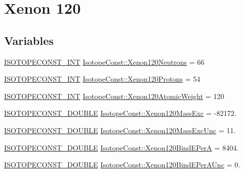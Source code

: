 \hypertarget{group___isotope_const-_xenon-_xe120}{}\section{Xenon 120}
\label{group___isotope_const-_xenon-_xe120}
\subsection*{Variables}
\begin{DoxyCompactItemize}
\item 
\mbox{\hyperlink{group___isotope_const-_macros_ga5f18360b3e99483a35c32d789e62621c}{I\+S\+O\+T\+O\+P\+E\+C\+O\+N\+S\+T\+\_\+\+I\+NT}} \mbox{\hyperlink{group___isotope_const-_xenon-_xe120_gaa4719d12c909c03c1bf8dfccb81d6556}{Isotope\+Const\+::\+Xenon120\+Neutrons}} = 66
\item 
\mbox{\hyperlink{group___isotope_const-_macros_ga5f18360b3e99483a35c32d789e62621c}{I\+S\+O\+T\+O\+P\+E\+C\+O\+N\+S\+T\+\_\+\+I\+NT}} \mbox{\hyperlink{group___isotope_const-_xenon-_xe120_ga835b7d6b04906dff91cb4f7c5fd80632}{Isotope\+Const\+::\+Xenon120\+Protons}} = 54
\item 
\mbox{\hyperlink{group___isotope_const-_macros_ga5f18360b3e99483a35c32d789e62621c}{I\+S\+O\+T\+O\+P\+E\+C\+O\+N\+S\+T\+\_\+\+I\+NT}} \mbox{\hyperlink{group___isotope_const-_xenon-_xe120_gaeb479bf69869d736ecaa35c4b21b3c3b}{Isotope\+Const\+::\+Xenon120\+Atomic\+Weight}} = 120
\item 
\mbox{\hyperlink{group___isotope_const-_macros_ga8f45a7272ce02c0b4c65c44636ed719a}{I\+S\+O\+T\+O\+P\+E\+C\+O\+N\+S\+T\+\_\+\+D\+O\+U\+B\+LE}} \mbox{\hyperlink{group___isotope_const-_xenon-_xe120_gaa755d3c55e1ffe8d25213a2af90e198f}{Isotope\+Const\+::\+Xenon120\+Mass\+Exc}} = -\/82172.
\item 
\mbox{\hyperlink{group___isotope_const-_macros_ga8f45a7272ce02c0b4c65c44636ed719a}{I\+S\+O\+T\+O\+P\+E\+C\+O\+N\+S\+T\+\_\+\+D\+O\+U\+B\+LE}} \mbox{\hyperlink{group___isotope_const-_xenon-_xe120_ga8eaf085251144a17d67bd8a25a6c94ec}{Isotope\+Const\+::\+Xenon120\+Mass\+Exc\+Unc}} = 11.
\item 
\mbox{\hyperlink{group___isotope_const-_macros_ga8f45a7272ce02c0b4c65c44636ed719a}{I\+S\+O\+T\+O\+P\+E\+C\+O\+N\+S\+T\+\_\+\+D\+O\+U\+B\+LE}} \mbox{\hyperlink{group___isotope_const-_xenon-_xe120_ga2cc1f93e30f9a86b2f9664dc2d418586}{Isotope\+Const\+::\+Xenon120\+Bind\+E\+PerA}} = 8404.
\item 
\mbox{\hyperlink{group___isotope_const-_macros_ga8f45a7272ce02c0b4c65c44636ed719a}{I\+S\+O\+T\+O\+P\+E\+C\+O\+N\+S\+T\+\_\+\+D\+O\+U\+B\+LE}} \mbox{\hyperlink{group___isotope_const-_xenon-_xe120_ga37aa113f92c3d3e206925367bfffe5d7}{Isotope\+Const\+::\+Xenon120\+Bind\+E\+Per\+A\+Unc}} = 0.

\end{DoxyCompactItemize}
